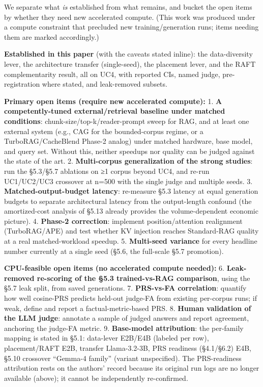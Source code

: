 \documentclass[10pt,twocolumn]{article}
\begin{document}
We separate what \emph{is} established from what remains, and bucket the open items by whether they need new accelerated compute. (This work was produced under a compute constraint that precluded new training/generation runs; items needing them are marked accordingly.)

\textbf{Established in this paper} (with the caveats stated inline): the data-diversity lever, the architecture transfer (single-seed), the placement lever, and the RAFT complementarity result, all on UC4, with reported CIs, named judge, pre-registration where stated, and leak-removed subsets.

\textbf{Primary open items (require new accelerated compute):}
1. \textbf{A competently-tuned external/retrieval baseline under matched conditions}: chunk-size/top-k/reader-prompt sweep for RAG, and at least one external system (e.g., CAG for the bounded-corpus regime, or a TurboRAG/CacheBlend Phase-2 analog) under matched hardware, base model, and query set. Without this, neither speedups nor quality can be judged against the state of the art.
2. \textbf{Multi-corpus generalization of the strong studies}: run the §5.3/§5.7 ablations on ≥1 corpus beyond UC4, and re-run UC1/UC2/UC3 crossover at n=500 with the single judge and multiple seeds.
3. \textbf{Matched-output-budget latency}: re-measure §5.3 latency at equal generation budgets to separate architectural latency from the output-length confound (the amortized-cost analysis of §5.13 already provides the volume-dependent economic picture).
4. \textbf{Phase-2 correction}: implement position/attention realignment (TurboRAG/APE) and test whether KV injection reaches Standard-RAG quality at a real matched-workload speedup.
5. \textbf{Multi-seed variance} for every headline number currently at a single seed (§5.6, the full-scale §5.7 promotion).

\textbf{CPU-feasible open items (no accelerated compute needed):}
6. \textbf{Leak-removed re-scoring of the §5.3 trained-vs-RAG comparison}, using the §5.7 leak split, from saved generations.
7. \textbf{PRS-vs-FA correlation}: quantify how well cosine-PRS predicts held-out judge-FA from existing per-corpus runs; if weak, define and report a factual-metric-based PRS.
8. \textbf{Human validation of the LLM judge}: annotate a sample of judged answers and report agreement, anchoring the judge-FA metric.
9. \textbf{Base-model attribution}: the per-family mapping is stated in §5.1: data-lever E2B/E4B (labeled per row), placement/RAFT E2B, transfer Llama-3.2-3B, PRS readiness (§4.1/§6.2) E4B, §5.10 crossover ``Gemma-4 family'' (variant unspecified). The PRS-readiness attribution rests on the authors' record because its original run logs are no longer available (above); it cannot be independently re-confirmed.
\end{document}
